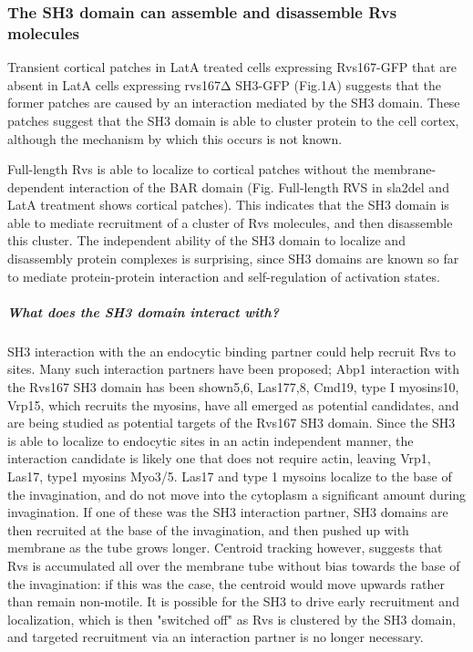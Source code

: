 \subsubsection{The SH3 domain can assemble and disassemble Rvs molecules}
Transient cortical patches in LatA treated cells expressing Rvs167-GFP that are absent in LatA cells expressing rvs167Δ SH3-GFP (Fig.1A) suggests that the former patches are caused by an interaction mediated by the SH3 domain. These patches suggest that the SH3 domain is able to cluster protein to the cell cortex, although the mechanism by which this occurs is not known. 

Full-length Rvs is able to localize to cortical patches without the membrane-dependent interaction of the BAR domain (Fig. Full-length RVS in sla2del and LatA treatment shows cortical patches). This indicates that the SH3 domain is able to mediate recruitment of a cluster of Rvs molecules, and then disassemble this cluster.  The independent ability of the SH3 domain to localize and disassembly protein complexes is surprising, since SH3 domains are known so far to mediate protein-protein interaction and self-regulation of activation states. 


\subparagraph{What does the SH3 domain interact with?}
SH3 interaction with the an endocytic binding partner could help recruit Rvs to sites. Many such interaction partners have been proposed; Abp1 interaction with the Rvs167 SH3 domain has been shown5,6, Las177,8, Cmd19, type I myosins10, Vrp15, which recruits the myosins, have all emerged as potential candidates, and are being studied as potential targets of the Rvs167 SH3 domain. Since the SH3 is able to localize to endocytic sites in an actin independent manner, the interaction candidate is likely one that does not require actin, leaving Vrp1, Las17, type1 myosins Myo3/5. Las17 and type 1 mysoins localize to the base of the invagination, and do not move into the cytoplasm a significant amount during invagination. If one of these was the SH3 interaction partner, SH3 domains are then recruited at the base of the invagination, and then pushed up with membrane as the tube grows longer. Centroid tracking however, suggests that Rvs is accumulated all over the membrane tube without bias towards the base of the invagination: if this was the case, the centroid would move upwards rather than remain non-motile. It is possible for the SH3 to drive early recruitment and localization, which is then "switched off" as Rvs is clustered by the SH3 domain, and targeted recruitment via an interaction partner is no longer necessary. 


